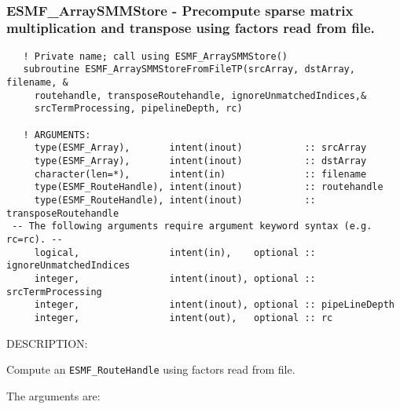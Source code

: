  
\mbox{}\hrulefill\ 
 
\subsubsection [ESMF\_ArraySMMStore] {ESMF\_ArraySMMStore - Precompute sparse matrix multiplication and transpose using factors read from file.}


  
\begin{verbatim}   ! Private name; call using ESMF_ArraySMMStore()
   subroutine ESMF_ArraySMMStoreFromFileTP(srcArray, dstArray, filename, &
     routehandle, transposeRoutehandle, ignoreUnmatchedIndices,&
     srcTermProcessing, pipelineDepth, rc)
 
   ! ARGUMENTS:
     type(ESMF_Array),       intent(inout)           :: srcArray
     type(ESMF_Array),       intent(inout)           :: dstArray
     character(len=*),       intent(in)              :: filename
     type(ESMF_RouteHandle), intent(inout)           :: routehandle
     type(ESMF_RouteHandle), intent(inout)           :: transposeRoutehandle
 -- The following arguments require argument keyword syntax (e.g. rc=rc). --
     logical,                intent(in),    optional :: ignoreUnmatchedIndices
     integer,                intent(inout), optional :: srcTermProcessing
     integer,                intent(inout), optional :: pipeLineDepth
     integer,                intent(out),   optional :: rc\end{verbatim}
{\sf DESCRIPTION:\\ }


  
   Compute an {\tt ESMF\_RouteHandle} using factors read from file.
  
   The arguments are:
  
